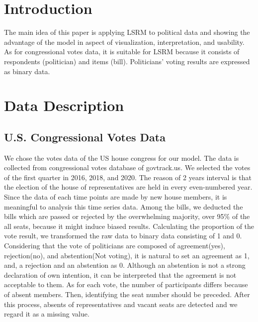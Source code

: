 \documentclass[a4paper, 11pt]{report}
\begin{document}
\clearpage
\chapter{Introduction} \label{Intro}

The main idea of this paper is applying LSRM to political data and showing the advantage of the model in aspect of visualization, interpretation, and usability. As for congressional votes data, it is suitable for LSRM because it consists of respondents (politician) and items (bill). Politicians' voting results are expressed as binary data.




\newcommand{\indep}{\raisebox{0.05em}{\rotatebox[origin=c]{90}{$\models$}}}
\chapter{Data Description} \label{Chapter2}
\section{U.S. Congressional Votes Data} \label{data}

We chose the votes data of the US house congress for our model. The data is collected from congressional votes database of govtrack.us. We selected the votes of the first quarter in 2016, 2018, and 2020. The reason of 2 years interval is that the election of the house of representatives are held in every even-numbered year. Since the data of each time points are made by new house members, it is meaningful to analysis this time series data. Among the bills, we deducted the bills which are passed or rejected by the overwhelming majority, over 95\% of the all seats, because it might induce biased results. Calculating the proportion of the vote result, we transformed the raw data to binary data consisting of 1 and 0. Considering that the vote of politicians are composed of agreement(yes), rejection(no), and abstention(Not voting), it is natural to set an agreement as 1, and, a rejection and an abstention as 0. Although an abstention is not a strong declaration of own intention, it can be interpreted that the agreement is not acceptable to them. As for each vote, the number of participants differs because of absent members. Then, identifying the seat number should be preceded. After this process, absents of representatives and vacant seats are detected and we regard it as a missing value.
\end{document}
